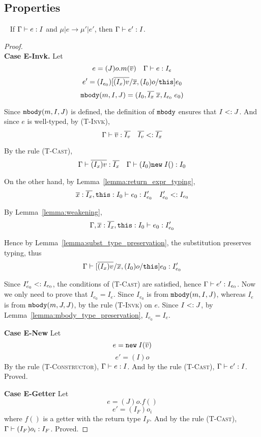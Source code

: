 \subsection{Properties}
\begin{theorem}~\label{theorem_subject}
If $\Gamma \; {\vdash} \; e : I$ and $\mu | e \rightarrow \mu' | e'$, 
then $\Gamma \; {\vdash} \; e' : I$.
\end{theorem}
\begin{proof} ~\\
\indent \textbf{Case E-Invk.} Let
  $$e = (J)o.m(\overline{v}) \quad \Gamma \; {\vdash} \; e : I_e$$
  $$e' = (I_{e_0})[\overline{(I_x)v}/\overline{x}, (I_0)o/\texttt{this}]e_0$$
  $$\texttt{mbody}(m, I, J) = (I_0, \overline{I_x} \; \overline{x}, I_{e_0} \; e_0)$$

Since $\texttt{mbody}(m, I, J)$ is defined, the definition of $\texttt{mbody}$ ensures that $I <: J$. And since $e$ is well-typed, by \textsc{(T-Invk)},
  $$\Gamma \; {\vdash} \; \overline{v} : \overline{I_v} \quad \overline{I_v} <: \overline{I_x}$$

By the rule \textsc{(T-Cast)},
  $$\Gamma \; {\vdash} \; \overline{(I_x)v} : \overline{I_x} \quad \Gamma \; {\vdash} \; (I_0)\texttt{new} \; I() : I_0$$
  
On the other hand, by Lemma~\ref{lemma:return_expr_typing},
  $$\overline{x} : \overline{I_x}, \texttt{this}: I_0 \; {\vdash} \; e_0 : I'_{e_0} \quad I'_{e_0} <: I_{e_0}$$
  
By Lemma~\ref{lemma:weakening},
  $$\Gamma, \overline{x} : \overline{I_x}, \texttt{this}: I_0 \; {\vdash} \; e_0 : I'_{e_0}$$

Hence by Lemma~\ref{lemma:subst_type_preservation}, the substitution preserves typing, thus
  $$\Gamma \; {\vdash} \; [\overline{(I_x)v}/\overline{x}, (I_0)o/\texttt{this}]e_0 : I'_{e_0}$$
  
Since $I'_{e_0} <: I_{e_0}$, the conditions of \textsc{(T-Cast)} are satisfied, hence $\Gamma \; {\vdash} \; e' : I_{e_0}$. Now we only need to prove that $I_{e_0} = I_e$. Since $I_{e_0}$ is from $\texttt{mbody}(m, I, J)$, whereas $I_e$ is from $\texttt{mbody}(m, J, J)$, by the rule \textsc{(T-Invk)} on $e$. Since $I <: J$, by Lemma~\ref{lemma:mbody_type_preservation}, $I_{e_0} = I_e$.

\indent \textbf{Case E-New} Let   
$$e = \texttt{new} \; I(\overline{v})$$   
$$e' = (I)o$$   
By the rule \textsc{(T-Constructor)}, $\Gamma \; {\vdash} \; e:I$. And by the rule \textsc{(T-Cast)}, $\Gamma \; {\vdash} \; e':I$. Proved.

\indent \textbf{Case E-Getter} Let
$$e = (J)o.f()$$
$$e' = (I_F)o_i$$
where $f()$ is a getter with the return type $I_F$. And by the rule \textsc{(T-Cast)}, $\Gamma \; {\vdash} \; (I_F)o_i:I_F$. Proved.


\end{proof}

